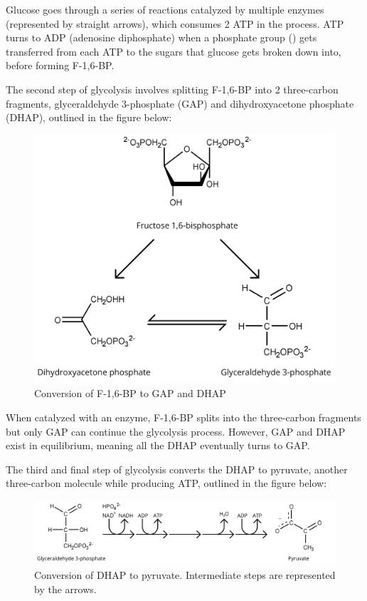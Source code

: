 \documentclass{article}
\begin{document}
Glucose goes through a series of reactions catalyzed by multiple enzymes (represented by straight arrows), which consumes 2 ATP in the process. ATP turns to ADP (adenosine diphosphate) when a phosphate group () gets transferred from each ATP to the sugars that glucose gets broken down into, before forming F-1,6-BP.

\medskip

The second step of glycolysis involves splitting F-1,6-BP into 2 three-carbon fragments, glyceraldehyde 3-phosphate (GAP) and dihydroxyacetone phosphate (DHAP), outlined in the figure below:
\begin{figure}[H]
    \centering
    \includegraphics[width=0.55\linewidth]{figures/figure_02.png}
    \caption{Conversion of F-1,6-BP to GAP and DHAP}
    \label{fig:figure1}
\end{figure}

\medskip

When catalyzed with an enzyme, F-1,6-BP splits into the three-carbon fragments but only GAP can continue the glycolysis process. However, GAP and DHAP exist in equilibrium, meaning all the DHAP eventually turns to GAP.

\medskip

The third and final step of glycolysis converts the DHAP to pyruvate, another three-carbon molecule while producing ATP, outlined in the figure below:
\begin{figure}[H]
    \centering
    \includegraphics[width=0.886\linewidth]{figures/figure_03.png}
    \caption{Conversion of DHAP to pyruvate. Intermediate steps are represented by the arrows.}
    \label{fig:figure1}
\end{figure}
\end{document}
